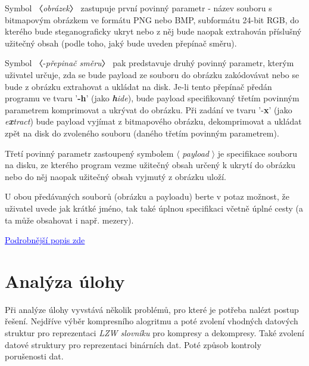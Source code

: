 \documentclass[12pt]{report}
\begin{document}
    Symbol 〈\textit{obrázek}〉 zastupuje první povinný parametr - název souboru s bitmapovým obrázkem ve formátu PNG nebo BMP, subformátu 24-bit RGB, do kterého bude steganograficky ukryt nebo
    z něj bude naopak extrahován příslušný užitečný obsah (podle toho, jaký bude uveden přepínač směru).

    Symbol 〈-\textit{přepinač směru}〉 pak predstavuje druhý povinný parametr, kterým uživatel určuje, zda se bude payload ze souboru do obrázku zakódovávat nebo se bude z obrázku extrahovat a ukládat na disk. Je-li tento přepínač předán programu ve tvaru '\textbf{-h}' (jako\textit{ \textbf{h}ide}), bude payload specifikovaný třetím povinným parametrem komprimovat a ukrývat do obrázku. Při zadání ve tvaru '-\textbf{x}' (jako \textit{e\textbf{x}tract}) bude payload vyjímat z bitmapového obrázku, dekomprimovat a ukládat zpět na disk do zvoleného souboru (daného třetím povinným parametrem).

    Třetí povinný parametr zastoupený symbolem $\langle$ \textit{payload} $\rangle$ je specifikace souboru na disku, ze kterého program vezme užitečný obsah určený k ukrytí do obrázku nebo do něj naopak užitečný obsah vyjmutý z obrázku uloží.

    U obou předávaných souborů (obrázku a payloadu) berte v potaz možnost, že uživatel uvede jak krátké jméno, tak také úplnou specifikaci včetně úplné cesty (a ta může obsahovat i např. mezery).

    \href{https://www.kiv.zcu.cz/studies/predmety/pc/data/works/sw2023-02.pdf}{\textcolor{blue}{\underline{Podrobnější popis zde}}}



    \chapter{Analýza úlohy}
    Při analýze úlohy vyvstává několik problémů, pro které je potřeba nalézt postup řešení. Nejdříve výběr kompresního alogritmu a poté zvolení vhodných datových struktur pro reprezentaci \textit{LZW slovníku} pro kompresy a dekompresy. Také zvolení datové struktury pro reprezentaci binárních dat. Poté způsob kontroly porušenosti dat.
\end{document}
